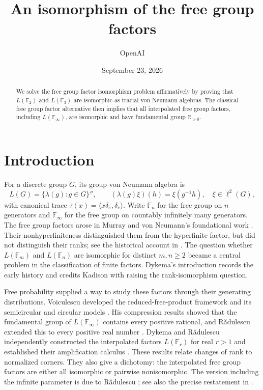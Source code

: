 \documentclass[11pt]{article}
\title{An isomorphism of the free group factors}
\author{OpenAI}
\date{September 23, 2026}
\numberwithin{equation}{section}
\theoremstyle{definition}
\theoremstyle{remark}
\newcommand{\F}{\mathbb F}
\newcommand{\R}{\mathbb R}
\begin{document}
\maketitle
\begin{abstract}
We solve the free group factor isomorphism problem affirmatively by proving
that $L(\F_2)$ and $L(\F_3)$ are isomorphic as tracial von Neumann algebras.
The classical free group factor alternative then implies that all interpolated
free group factors, including $L(\F_\infty)$, are isomorphic and have
fundamental group $\R_{>0}$.
\end{abstract}

\section{Introduction}
For a discrete group $G$, its group von Neumann algebra is
\[
 L(G)=\{\lambda(g):g\in G\}'',\qquad
 (\lambda(g)\xi)(h)=\xi(g^{-1}h),\quad \xi\in\ell^2(G),
\]
with canonical trace $\tau(x)=\langle x\delta_e,\delta_e\rangle$.
Write $\F_n$ for the free group on $n$ generators and $\F_\infty$ for the free group on countably infinitely many generators. The free group factors arose in Murray and von Neumann's foundational work \cite{murray_vonneumann1943}. Their nonhyperfiniteness distinguished them from the hyperfinite factor, but did not distinguish their ranks; see the historical account in \cite[p.~518]{radulescu1992}. The question whether $L(\F_m)$ and $L(\F_n)$ are isomorphic for distinct $m,n\geq2$ became a central problem in the classification of finite factors. Dykema's introduction \cite[p.~123]{dykema1994} records the early history and credits Kadison with raising the rank-isomorphism question.

Free probability supplied a way to study these factors through their generating distributions. Voiculescu developed the reduced-free-product framework \cite{voiculescu1985} and its semicircular and circular models \cite{voiculescu1990}. His compression results showed that the fundamental group of $L(\F_\infty)$ contains every positive rational, and R\u adulescu extended this to every positive real number \cite{radulescu1992}. Dykema and R\u adulescu independently constructed the interpolated factors $L(\F_r)$ for real $r>1$ and established their amplification calculus \cite{dykema1994,radulescu1994}. These results relate changes of rank to normalized corners. They also give a dichotomy: the interpolated free group factors are either all isomorphic or pairwise nonisomorphic. The version including the infinite parameter is due to R\u adulescu \cite[Corollary~4.7]{radulescu1994}; see also the precise restatement in \cite[Theorem~1.1]{goldbring_pi2025}.
\end{document}
